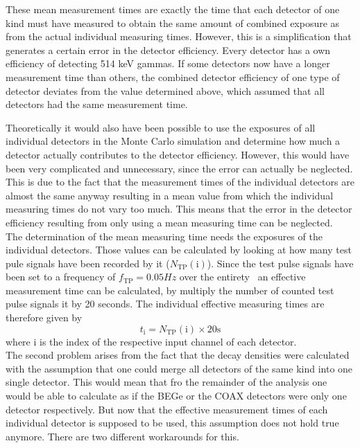 \documentclass[encoding=utf8,british]{tumphthesis}
\begin{document}
These mean measurement times are exactly the time that each detector of one kind must have measured to obtain the same amount of combined exposure as from the actual individual measuring times.
However, this is a simplification that generates a certain error in the detector efficiency.
Every detector has a own efficiency of detecting 514 keV gammas.
If some detectors now have a longer measurement time than others, the combined detector efficiency of one type of detector deviates from the value determined above, which assumed that all detectors had the same measurement time.

Theoretically it would also have been possible to use the exposures of all individual detectors in the Monte Carlo simulation and determine how much a detector actually contributes to the detector efficiency.
However, this would have been very complicated and unnecessary, since the error can actually be neglected.
This is due to the fact that the measurement times of the individual detectors are almost the same anyway resulting in a mean value from which the individual measuring times do not vary too much.
This means that the error in the detector efficiency resulting from only using a mean measuring time can be neglected.  
\\

\iffalse
The determination of the mean measuring time needs the exposures of the individual detectors.
Those values can be calculated by looking at how many test pule signals have been recorded by it ($N_{\mathrm{TP}}(\mathrm{i})$). 
Since the test pulse signals have been set to a frequency of $f_\mathrm{TP} = 0.05\unit{Hz} $ over the entirety \PII\, an effective measurement time can be calculated, by multiply the number of counted test pulse signals it by 20 seconds.
The individual effective measuring times are therefore given by
\begin{equation*}
    t_\mathrm{i} = N_{\mathrm{TP}}(\mathrm{i}) \times 20\mathrm{s}
\end{equation*}
where i is the index of the respective input channel of each detector.
\\

The second problem arises from the fact that the decay densities were  calculated with the assumption that one could merge all detectors of the same kind into one single detector.
This would mean that fro the remainder of the analysis one would be able to calculate as if the BEGe or the COAX detectors were only one detector respectively.
But now that the effective measurement times of each individual detector is supposed to be used, this assumption does not hold true anymore.
There are two different workarounds for this.
\\
\end{document}

